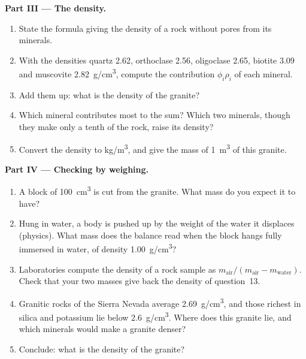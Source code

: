 \begin{problem}
\medskip
\noindent\textbf{Part III --- The density.}
\begin{enumerate}[resume]
  \item State the formula giving the density of a rock without pores from
        its minerals.
  \item With the densities quartz \qty{2.62}{}, orthoclase \qty{2.56}{},
        oligoclase \qty{2.65}{}, biotite \qty{3.09}{} and muscovite
        \qty{2.82}{g/cm^3}, compute the contribution $\phi_i \rho_i$ of
        each mineral.
  \item Add them up: what is the density of the granite?
  \item Which mineral contributes most to the sum? Which two minerals,
        though they make only a tenth of the rock, raise its density?
  \item Convert the density to \unit{kg/m^3}, and give the mass of
        \qty{1}{m^3} of this granite.
\end{enumerate}

\medskip
\noindent\textbf{Part IV --- Checking by weighing.}
\begin{enumerate}[resume]
  \item A block of \qty{100}{cm^3} is cut from the granite. What mass do you
        expect it to have?
  \item Hung in water, a body is pushed up by the weight of the water it
        displaces (physics). What mass does the balance read when the block
        hangs fully immersed in water, of density \qty{1.00}{g/cm^3}?
  \item Laboratories compute the density of a rock sample as
        $m_{\text{air}}/(m_{\text{air}} - m_{\text{water}})$. Check that
        your two masses give back the density of question~13.
  \item Granitic rocks of the Sierra Nevada average \qty{2.69}{g/cm^3}, and
        those richest in silica and potassium lie below \qty{2.6}{g/cm^3}.
        Where does this granite lie, and which minerals would make a
        granite denser?
  \item Conclude: what is the density of the granite?
\end{enumerate}
\end{problem}
